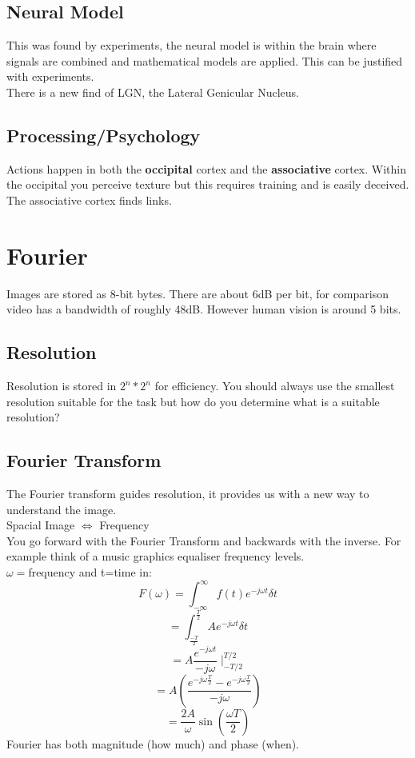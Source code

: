 \documentclass{article}
\begin{document}
	\subsection{Neural Model}
	This was found by experiments, the neural model is within the brain where signals are combined and mathematical models are applied. This can be justified with experiments.\\
	There is a new find of LGN, the Lateral Genicular Nucleus.
	\subsection{Processing/Psychology}
	Actions happen in both the \textbf{occipital} cortex and the \textbf{associative} cortex. Within the occipital you perceive texture but this requires training and is easily deceived.\\
	The associative cortex finds links.
	
	\section{Fourier}
	Images are stored as 8-bit bytes. There are about 6dB per bit, for comparison video has a bandwidth of roughly 48dB. However human vision is around 5 bits.
	\subsection{Resolution}
	Resolution is stored in $2^n*2^n$ for efficiency. You should always use the smallest resolution suitable for the task but how do you determine what is a suitable resolution?
	\subsection{Fourier Transform}
	The Fourier transform guides resolution, it provides us with a new way to understand the image.\\
	Spacial Image $\Longleftrightarrow$ Frequency\\
	You go forward with the Fourier Transform and backwards with the inverse. For example think of a music graphics equaliser frequency levels.\\
	$\omega=$frequency and t=time in:
	$$F(\omega)=\int_{-\infty}^{\infty}f(t)e^{-j\omega t}\delta t$$
	$$=\int_{\frac{-T}{2}}^{\frac{T}{2}}Ae^{-j\omega t}\delta t$$
	$$=A\frac{e^{-j\omega t}}{-j\omega}\mid_{-T/2}^{T/2}$$
	$$=A(\frac{e^{-j\omega\frac{T}{2}}-e^{-j\omega\frac{T}{2}}}{-j\omega})$$
	$$=\frac{2A}{\omega}\sin(\frac{\omega T}{2})$$
	Fourier has both magnitude (how much) and phase (when).
\end{document}
